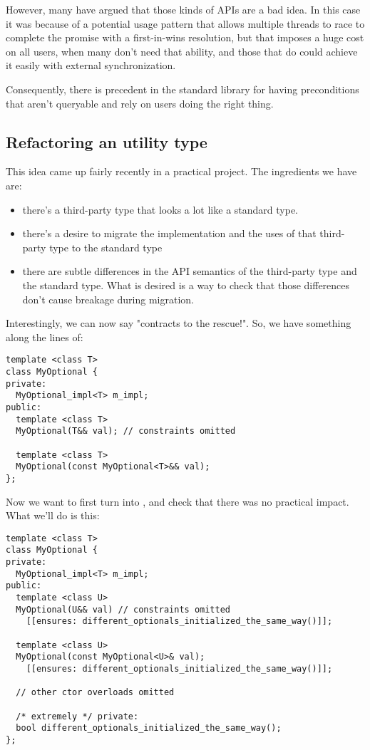 However, many have argued that those kinds of APIs are a bad idea. In this case
it was because of a potential usage pattern that allows multiple threads to race
to complete the promise with a first-in-wins resolution, but that imposes a huge
cost on all users, when many don’t need that ability, and those that do could
achieve it easily with external synchronization.

Consequently, there is precedent in the standard library for having
preconditions that aren’t queryable and rely on users doing the right thing.

\subsection{Refactoring an utility type}

This idea came up fairly recently in a practical project. The ingredients we have are:

\begin{itemize}

\item
there's a third-party type that looks a lot like a standard type.

\item
there's a desire to migrate the implementation and the uses of that third-party type to the standard type

\item
there are subtle differences in the API semantics of the third-party type and the standard type. What is desired is a way to check that those differences don't cause breakage during migration.

\end{itemize}

Interestingly, we can now say "contracts to the rescue!". So, we have something along the lines of:

\begin{lstlisting}
template <class T>
class MyOptional {
private:
  MyOptional_impl<T> m_impl;
public:
  template <class T>
  MyOptional(T&& val); // constraints omitted

  template <class T>
  MyOptional(const MyOptional<T>&& val);
};
\end{lstlisting}

Now we want to first turn  into , and check that
there was no practical impact. What we'll do is this:

\begin{lstlisting}
template <class T>
class MyOptional {
private:
  MyOptional_impl<T> m_impl;
public:
  template <class U>
  MyOptional(U&& val) // constraints omitted
    [[ensures: different_optionals_initialized_the_same_way()]];

  template <class U>
  MyOptional(const MyOptional<U>& val);
    [[ensures: different_optionals_initialized_the_same_way()]];

  // other ctor overloads omitted

  /* extremely */ private:
  bool different_optionals_initialized_the_same_way();
};
\end{lstlisting}

